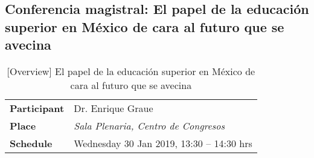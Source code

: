 \documentclass[11pt,a4paper]{article}
\begin{document}


\clearpage

\subsection{Conferencia magistral: El papel de la educación superior en México de cara al futuro que se avecina}\label{sec:conference1}

\parencite{Graue2019}
\begin{table}[h] %
\centering
\begin{tabular}{|l|l|}
\hline
\textbf{Participant} & Dr. Enrique Graue \\
\textbf{Place}       & \emph{Sala Plenaria, Centro de Congresos} \\
\textbf{Schedule}    & Wednesday 30 Jan 2019, 13:30 – 14:30 hrs \\
\hline
\end{tabular}
\caption{[Overview] El papel de la educación superior en México de cara al futuro que se avecina}\label{tab:table}
\end{table}








\end{document}
